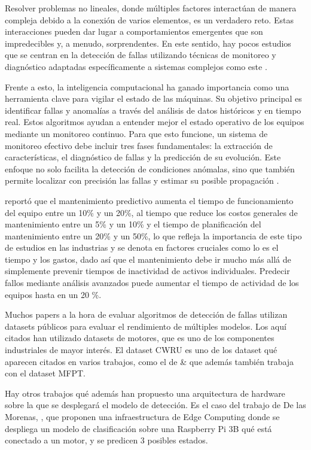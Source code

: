 \documentclass[11pt,a4paper,spanish]{book}
\numberwithin{equation}{chapter}
\numberwithin{figure}{chapter}
\begin{document}
Resolver problemas no lineales, donde múltiples factores interactúan de manera 
compleja debido a la conexión de varios elementos, es un verdadero reto. 
Estas interacciones pueden dar lugar a comportamientos emergentes que son impredecibles 
y, a menudo, sorprendentes. En este sentido, hay pocos estudios que se centran en la 
detección de fallas utilizando técnicas de monitoreo y diagnóstico adaptadas 
específicamente a sistemas complejos como este \cite{zhang2017overview}. 


Frente a esto, la inteligencia computacional ha ganado importancia como una herramienta 
clave para vigilar el estado de las máquinas. Su objetivo principal es identificar 
fallas y anomalías a través del análisis de datos históricos y en tiempo real. 
Estos algoritmos ayudan a entender mejor el estado operativo de los equipos mediante un 
monitoreo continuo. Para que esto funcione, un sistema de monitoreo efectivo debe 
incluir tres fases fundamentales: la extracción de características, el diagnóstico de 
fallas y la predicción de su evolución. Este enfoque no solo facilita la detección de 
condiciones anómalas, sino que también permite localizar con precisión las fallas y 
estimar su posible propagación \cite{randall2011vibration}.


\cite{deloitte2022predictive} reportó que el mantenimiento predictivo aumenta el 
tiempo de funcionamiento del equipo entre un 10\% y un 20\%, al tiempo que reduce los 
costos generales de mantenimiento entre un 5\% y un 10\% y el tiempo de planificación 
del mantenimiento entre un 20\% y un 50\%, lo que refleja la importancia de este tipo 
de estudios en las industrias y se denota en factores cruciales como lo es el tiempo y 
los gastos, dado así que el mantenimiento debe ir mucho más allá de simplemente 
prevenir tiempos de inactividad de activos individuales. Predecir fallos mediante 
análisis avanzados puede aumentar el tiempo de actividad de los equipos hasta en un 
20 \%.


Muchos papers a la hora de evaluar algoritmos de detección de fallas utilizan datasets 
públicos para evaluar el rendimiento de múltiples modelos. Los aquí citados han 
utilizado datasets de motores, que es uno de los componentes industriales de mayor 
interés. El dataset CWRU es uno de los dataset qué aparecen citados en varios trabajos, 
como el de \cite{yu2025tkeo} \& \cite{raj2024bearing} que además también trabaja con el 
dataset MFPT.


Hay otros trabajos qué además han propuesto una arquitectura de hardware sobre la que se 
desplegará el modelo de detección. Es el caso del trabajo de De las Morenas, 
\cite{delasmorenas2025bearing}, que proponen una infraestructura de Edge Computing 
donde se despliega un modelo de clasificación sobre una Raspberry Pi 3B qué está 
conectado a un motor, y se predicen 3 posibles estados.
\end{document}
